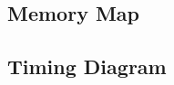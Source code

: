 \documentclass{article}
\begin{document}
  \subsection{Memory Map}

  \subsection{Timing Diagram}


\end{document}
